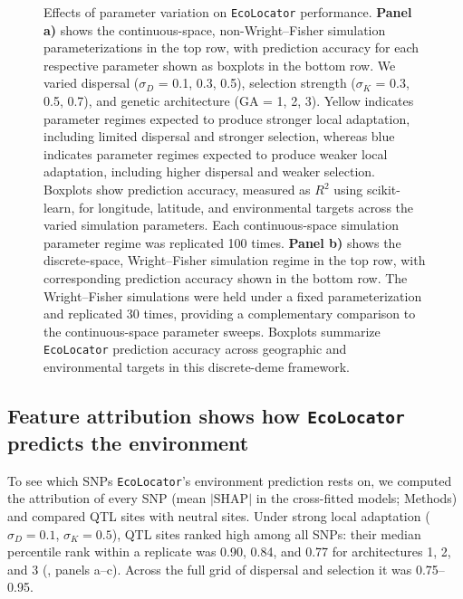 \documentclass[]{article}
\newcommand{\ecolocator}{\texttt{EcoLocator}\xspace}
\begin{document}
\begin{figure}[H] 
    \caption{Effects of parameter variation on \ecolocator performance. \textbf{Panel a)} 
    shows the continuous-space, non-Wright--Fisher simulation
    parameterizations in the top row, with prediction accuracy for each respective
    parameter shown as boxplots in the bottom row. We varied dispersal
    (\(\sigma_D\) = 0.1, 0.3, 0.5), selection strength
    (\(\sigma_K\) = 0.3, 0.5, 0.7), and genetic architecture
    (GA = 1, 2, 3). Yellow indicates parameter regimes expected to produce
    stronger local adaptation, including limited dispersal and stronger selection,
    whereas blue indicates parameter regimes expected to produce weaker local adaptation, 
    including higher dispersal and weaker selection.
    Boxplots show prediction accuracy, measured as $R^2$ using scikit-learn,
    for longitude, latitude, and environmental targets across the varied
    simulation parameters. Each continuous-space simulation parameter regime
    was replicated 100 times. \textbf{Panel b)} shows the discrete-space,
    Wright--Fisher simulation regime in the top row, with corresponding
    prediction accuracy shown in the bottom row. The Wright--Fisher simulations
    were held under a fixed parameterization and replicated 30 times,
    providing a complementary comparison to the continuous-space parameter
    sweeps. Boxplots summarize \ecolocator prediction accuracy across
    geographic and environmental targets in this discrete-deme framework.} 
    \label{fig:sim-performance}
\end{figure}

\subsection{Feature attribution shows how \ecolocator predicts the environment}

To see which SNPs \ecolocator's environment prediction rests on,
we computed the attribution of every SNP
(mean $|\mathrm{SHAP}|$ in the cross-fitted models; Methods)
and compared QTL sites with neutral sites.
Under strong local adaptation ($\sigma_D = 0.1$, $\sigma_K = 0.5$),
QTL sites ranked high among all SNPs:
their median percentile rank within a replicate
was 0.90, 0.84, and 0.77 for architectures 1, 2, and 3
(, panels a--c).
Across the full grid of dispersal and selection it was 0.75--0.95.
\end{document}
